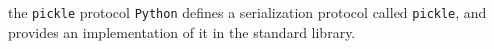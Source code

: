 \documentclass[13pt, usenames,dvipsnames]{beamer} %
\newcommand{\mycode}[2][\tiny] {\texttt{#2}}
\begin{document}
    \begin{frame}[t]{the \mycode[\small]{pickle} protocol}
        \vspace{2em}
        \footnotesize
        \mycode[\small]{Python} defines a serialization protocol called
        \mycode[\small]{pickle}, and provides an implementation of it in the
        standard library.

        \inputminted[bgcolor=beige, fontsize=\tiny]{python}{scripts/pickle_example.py}
    \end{frame}
\end{document}
